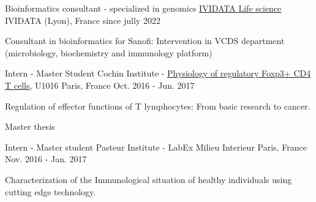 

\begin{cventries}

 \cventry
    {Bioinformatics consultant - specialized in genomics} %
    {\href{https://www.ividata.com/}{IVIDATA Life science}} %
    {IVIDATA (Lyon), France} %
    {since jully 2022} %
    {
      \begin{cvitems} %
        \item {Consultant in bioinformatics for Sanofi: Intervention in VCDS department (microbiology, biochemistry and immunology platform)}
      \end{cvitems}
    }
    
  \cventry
    {Intern - Master Student}%
    {Cochin Institute - \href{https://www.institutcochin.fr/departments/3i/team-lucas/physiology-of-regulatory-foxp3-cd4-t-cells}{Physiology of regulatory Foxp3+ CD4 T cells}, U1016} %
    {Paris, France} %
    {Oct. 2016 - Jun. 2017} %
    {
      \begin{cvitems} %
        \item {Regulation of effector functions of T lymphocytes: From basic research to cancer.}
        \item {Master thesis}
      \end{cvitems}
    }

  \cventry
    {Intern - Master student} %
    {Pasteur Institute - LabEx Milieu Interieur} %
    {Paris, France} %
    {Nov. 2016 - Jan. 2017} %
    {
      \begin{cvitems} %
        \item {Characterization of the Immunological situation of healthy individuals using cutting edge technology.}
      \end{cvitems}
    }


\end{cventries}
